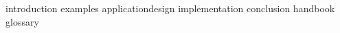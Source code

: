 \documentclass[11pt,a4paper]{report}
\newcommand{\texdir}{../tex/} %
\begin{document}
\inserttitlepage


\inserttoc

{introduction}
{examples}
{applicationdesign}
{implementation}
{conclusion}
\appendix
{handbook}
{glossary}


\nocite{*}
\end{document}
